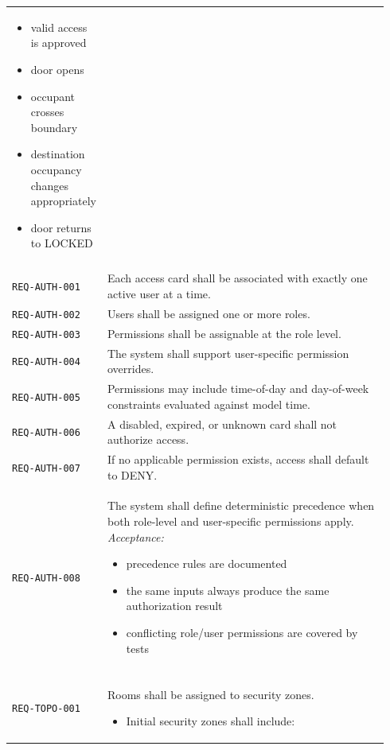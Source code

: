 \documentclass[11pt]{article}
\providecommand{\tightlist}{\setlength{\itemsep}{0pt}\setlength{\parskip}{0pt}}
\begin{document}
\begin{longtable}[]{@{}
>{\raggedright\arraybackslash}p{0.18\linewidth}
>{\raggedright\arraybackslash}p{0.76\linewidth}@{}}
\begin{itemize}\tightlist
\item valid access is approved
\item door opens
\item occupant crosses boundary
\item destination occupancy changes appropriately
\item door returns to LOCKED
\end{itemize} \\
\addlinespace[3pt]
\multicolumn{2}{@{}l}{\textbf{Authorization requirements}} \\[2pt]
\texttt{REQ-AUTH-001} & Each access card shall be associated with exactly one active user at a time. \\
\addlinespace[3pt]
\texttt{REQ-AUTH-002} & Users shall be assigned one or more roles. \\
\addlinespace[3pt]
\texttt{REQ-AUTH-003} & Permissions shall be assignable at the role level. \\
\addlinespace[3pt]
\texttt{REQ-AUTH-004} & The system shall support user-specific permission overrides. \\
\addlinespace[3pt]
\texttt{REQ-AUTH-005} & Permissions may include time-of-day and day-of-week constraints evaluated against model time. \\
\addlinespace[3pt]
\texttt{REQ-AUTH-006} & A disabled, expired, or unknown card shall not authorize access. \\
\addlinespace[3pt]
\texttt{REQ-AUTH-007} & If no applicable permission exists, access shall default to DENY. \\
\addlinespace[3pt]
\texttt{REQ-AUTH-008} & The system shall define deterministic precedence when both role-level and user-specific permissions apply.
\textit{Acceptance:}
\begin{itemize}\tightlist
\item precedence rules are documented
\item the same inputs always produce the same authorization result
\item conflicting role/user permissions are covered by tests
\end{itemize} \\
\addlinespace[3pt]
\multicolumn{2}{@{}l}{\textbf{Topology requirements}} \\[2pt]
\texttt{REQ-TOPO-001} & Rooms shall be assigned to security zones.
\begin{itemize}\tightlist
\item Initial security zones shall include:

\end{itemize}
\end{longtable}
\end{document}
